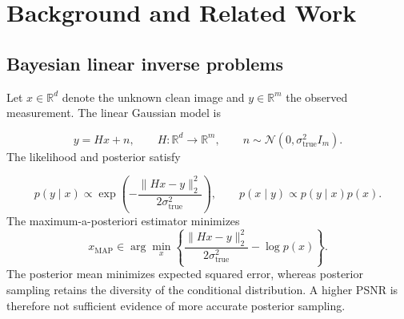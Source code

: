 \documentclass[11pt,a4paper]{article}
\newcommand{\Normal}{\mathcal{N}}
\newcommand{\sx}{\sigma_{\mathrm{true}}}
\begin{document}

\section{Background and Related Work}


\subsection{Bayesian linear inverse problems}

Let $x\in\mathbb{R}^{d}$ denote the unknown clean image and
$y\in\mathbb{R}^{m}$ the observed measurement.
The linear Gaussian model is

\begin{equation}
    y=Hx+n,
    \qquad
    H:\mathbb{R}^{d}\to\mathbb{R}^{m},
    \qquad
    n\sim\Normal(0,\sx^2 I_m).
    \label{eq:measurement}
\end{equation}
The likelihood and posterior satisfy

\begin{equation}
    p(y\mid x)
    \propto
    \exp\left(
        -\frac{\|Hx-y\|_2^2}{2\sx^2}
    \right),
    \qquad
    p(x\mid y)
    \propto
    p(y\mid x)p(x).
    \label{eq:bayes}
\end{equation}
The maximum-a-posteriori estimator minimizes
\begin{equation}
    x_{\mathrm{MAP}}
    \in
    \arg\min_x
    \left\{
        \frac{\|Hx-y\|_2^2}{2\sx^2}
        -
        \log p(x)
    \right\}.
    \label{eq:map}
\end{equation}
The posterior mean minimizes expected squared error, whereas posterior
sampling retains the diversity of the conditional distribution.
A higher PSNR is therefore not sufficient evidence of more accurate
posterior sampling.


\end{document}
